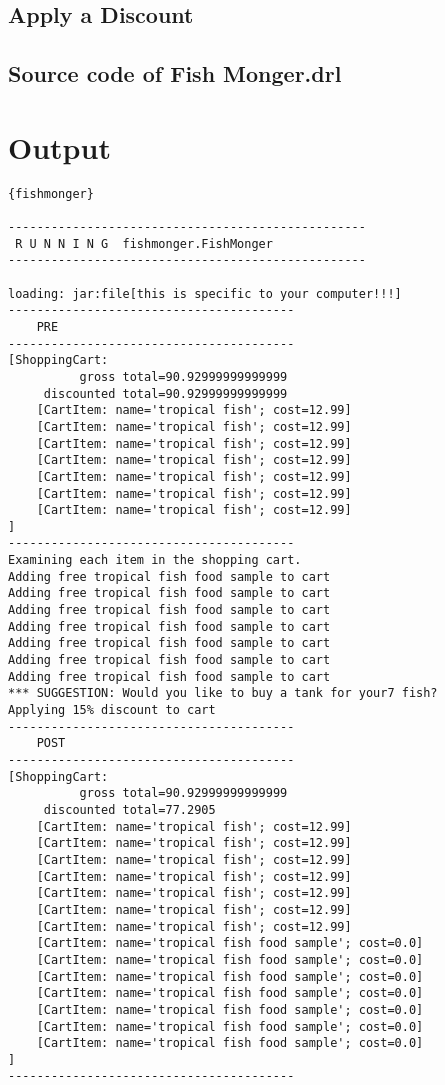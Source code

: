 \subsection{Apply a Discount}
\clearpage
\subsection{Source code of Fish Monger.drl}






\cleardoublepage
\section {Output}
\begin{lstlisting}{fishmonger}

--------------------------------------------------
 R U N N I N G  fishmonger.FishMonger
--------------------------------------------------

loading: jar:file[this is specific to your computer!!!]
----------------------------------------
    PRE
----------------------------------------
[ShoppingCart:
	      gross total=90.92999999999999
	 discounted total=90.92999999999999
	[CartItem: name='tropical fish'; cost=12.99]
	[CartItem: name='tropical fish'; cost=12.99]
	[CartItem: name='tropical fish'; cost=12.99]
	[CartItem: name='tropical fish'; cost=12.99]
	[CartItem: name='tropical fish'; cost=12.99]
	[CartItem: name='tropical fish'; cost=12.99]
	[CartItem: name='tropical fish'; cost=12.99]
]
----------------------------------------
Examining each item in the shopping cart.
Adding free tropical fish food sample to cart
Adding free tropical fish food sample to cart
Adding free tropical fish food sample to cart
Adding free tropical fish food sample to cart
Adding free tropical fish food sample to cart
Adding free tropical fish food sample to cart
Adding free tropical fish food sample to cart
*** SUGGESTION: Would you like to buy a tank for your7 fish?
Applying 15% discount to cart
----------------------------------------
    POST
----------------------------------------
[ShoppingCart:
	      gross total=90.92999999999999
	 discounted total=77.2905
	[CartItem: name='tropical fish'; cost=12.99]
	[CartItem: name='tropical fish'; cost=12.99]
	[CartItem: name='tropical fish'; cost=12.99]
	[CartItem: name='tropical fish'; cost=12.99]
	[CartItem: name='tropical fish'; cost=12.99]
	[CartItem: name='tropical fish'; cost=12.99]
	[CartItem: name='tropical fish'; cost=12.99]
	[CartItem: name='tropical fish food sample'; cost=0.0]
	[CartItem: name='tropical fish food sample'; cost=0.0]
	[CartItem: name='tropical fish food sample'; cost=0.0]
	[CartItem: name='tropical fish food sample'; cost=0.0]
	[CartItem: name='tropical fish food sample'; cost=0.0]
	[CartItem: name='tropical fish food sample'; cost=0.0]
	[CartItem: name='tropical fish food sample'; cost=0.0]
]
----------------------------------------
\end{lstlisting}

